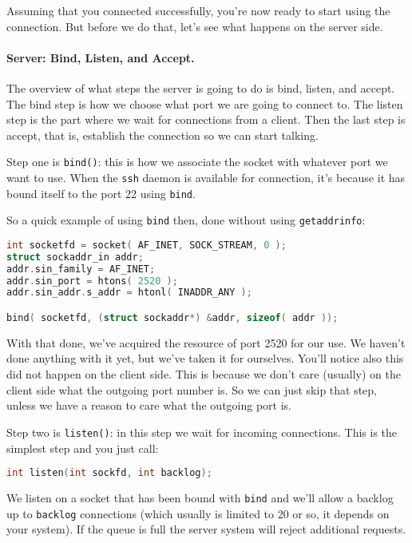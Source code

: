 Assuming that you connected successfully, you're now ready to start using the connection. But before we do that, let's see what happens on the server side.

\paragraph{Server: Bind, Listen, and Accept.}
The overview of what steps the server is going to do is bind, listen, and accept. The bind step is how we choose what port we are going to connect to. The listen step is the part where we wait for connections from a client. Then the last step is accept, that is, establish the connection so we can start talking.

Step one is \texttt{bind()}: this is how we associate the socket with whatever port we want to use. When the \texttt{ssh} daemon is available for connection, it's because it has bound itself to the port 22 using \texttt{bind}.

So a quick example of using \texttt{bind} then, done without using \texttt{getaddrinfo}:

\begin{lstlisting}[language=C]
int socketfd = socket( AF_INET, SOCK_STREAM, 0 );
struct sockaddr_in addr;
addr.sin_family = AF_INET;
addr.sin_port = htons( 2520 );
addr.sin_addr.s_addr = htonl( INADDR_ANY );

bind( socketfd, (struct sockaddr*) &addr, sizeof( addr ));
\end{lstlisting}

With that done, we've acquired the resource of port 2520 for our use. We haven't done anything with it yet, but we've taken it for ourselves. You'll notice also this did not happen on the client side. This is because we don't care (usually) on the client side what the outgoing port number is. So we can just skip that step, unless we have a reason to care what the outgoing port is.

Step two is \texttt{listen()}: in this step we wait for incoming connections. This is the simplest step and you just call:

\begin{lstlisting}[language=C]
int listen(int sockfd, int backlog); 
\end{lstlisting}

We listen on a socket that has been bound with \texttt{bind} and we'll allow a backlog up to \texttt{backlog} connections (which usually is limited to 20 or so, it depends on your system). If the queue is full the server system will reject additional requests.

